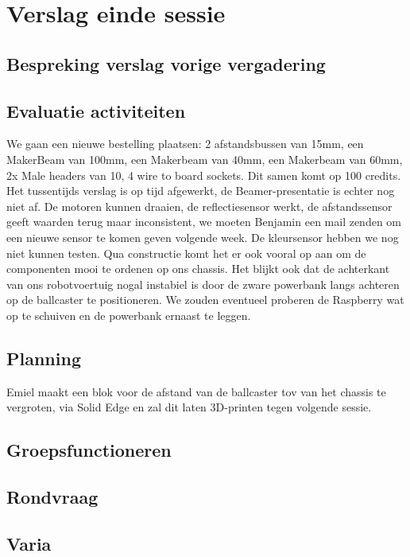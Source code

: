 \documentclass[a4paper,kulak]{kulakarticle} %
\begin{document}
\section{Verslag einde sessie}

\subsection{Bespreking verslag vorige vergadering}


\subsection{Evaluatie activiteiten}
We gaan een nieuwe bestelling plaatsen: 2 afstandsbussen van 15mm, een MakerBeam van 100mm, een Makerbeam van 40mm, een Makerbeam van 60mm, 2x Male headers van 10, 4 wire to board sockets. Dit samen komt op 100 credits. Het tussentijds verslag is op tijd afgewerkt, de Beamer-presentatie is echter nog niet af. De motoren kunnen draaien, de reflectiesensor werkt, de afstandssensor geeft waarden terug maar inconsistent, we moeten Benjamin een mail zenden om een nieuwe sensor te komen geven volgende week. De kleursensor hebben we nog niet kunnen testen. Qua constructie komt het er ook vooral op aan om de componenten mooi te ordenen op ons chassis. Het blijkt ook dat de achterkant van ons robotvoertuig nogal instabiel is door de zware powerbank langs achteren op de ballcaster te positioneren. We zouden eventueel proberen de Raspberry wat op te schuiven en de powerbank ernaast te leggen.


\subsection{Planning}
Emiel maakt een blok voor de afstand van de ballcaster tov van het chassis te vergroten, via Solid Edge en zal dit laten 3D-printen tegen volgende sessie.

\subsection{Groepsfunctioneren}

\subsection{Rondvraag}

\subsection{Varia}
\end{document}
